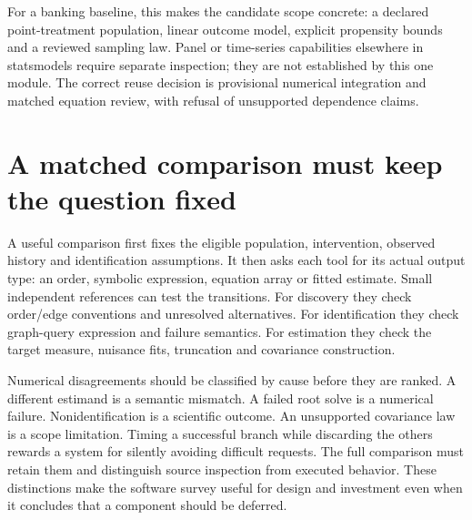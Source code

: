 For a banking baseline, this makes the candidate scope concrete: a declared
point-treatment population, linear outcome model, explicit propensity bounds
and a reviewed sampling law. Panel or time-series capabilities elsewhere in
statsmodels require separate inspection; they are not established by this one
module. The correct reuse decision is provisional numerical integration and
matched equation review, with refusal of unsupported dependence claims.

\section{A matched comparison must keep the question fixed}

A useful comparison first fixes the eligible population, intervention, observed
history and identification assumptions. It then asks each tool for its actual
output type: an order, symbolic expression, equation array or fitted estimate.
Small independent references can test the transitions. For discovery they
check order/edge conventions and unresolved alternatives. For identification
they check graph-query expression and failure semantics. For estimation they
check the target measure, nuisance fits, truncation and covariance construction.

Numerical disagreements should be classified by cause before they are ranked.
A different estimand is a semantic mismatch. A failed root solve is a numerical
failure. Nonidentification is a scientific outcome. An unsupported covariance
law is a scope limitation. Timing a successful branch while discarding the
others rewards a system for silently avoiding difficult requests. The full
comparison must retain them and distinguish source inspection from executed
behavior. These distinctions make the software survey useful for design and
investment even when it concludes that a component should be deferred.
